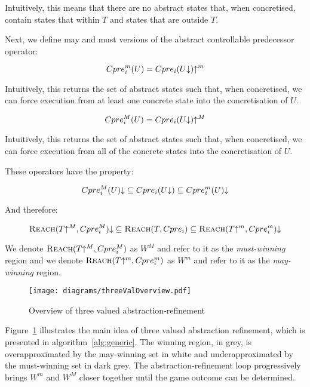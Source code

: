 Intuitively, this means that there are no abstract states that, when concretised, contain states that within $T$ and states that are outside $T$.

Next, we define may and must versions of the abstract controllable predecessor operator:

\begin{equation}
    Cpre_i^m(U) = Cpre_i(U\mathord{\downarrow})\mathord{\uparrow^m}
    \label{eqn:def_cpre_m}
\end{equation}

Intuitively, this returns the set of abstract states such that, when concretised, we can force execution from at least one concrete state into the concretisation of $U$.

\begin{equation}
    Cpre_i^M(U) = Cpre_i(U\mathord{\downarrow})\mathord{\uparrow^M}
    \label{eqn:def_cpre_M}
\end{equation}

Intuitively, this returns the set of abstract states such that, when concretised, we can force execution from all of the concrete states into the concretisation of $U$.

These operators have the property:

\begin{equation}
Cpre_i^M(U)\mathord{\downarrow} \subseteq Cpre_i(U\mathord{\downarrow}) \subseteq Cpre_i^m(U)\mathord{\downarrow}
\end{equation}

And therefore:

\begin{equation}
\textsc{Reach}(T\mathord{\uparrow^M}, Cpre_i^M)\mathord{\downarrow} \subseteq \textsc{Reach}(T, Cpre_i) \subseteq \textsc{Reach}(T\mathord{\uparrow^m}, Cpre_i^m)\mathord{\downarrow}
\end{equation}

We denote $\textsc{Reach}(T\mathord{\uparrow^M}, Cpre_i^M)$ as $W^M$ and refer to it as the \emph{must-winning} region and we denote $\textsc{Reach}(T\mathord{\uparrow^m}, Cpre_i^m)$ as $W^m$ and refer to it as the \emph{may-winning} region.

\begin{figure}[t]
\centering
\texttt{[image: diagrams/threeValOverview.pdf]}
\caption{Overview of three valued abstraction-refinement}
\label{fig:three_val_overview}
\end{figure}

Figure~\ref{fig:three_val_overview} illustrates the main idea of three valued abstraction refinement, which is presented in algorithm~\ref{alg:generic}. The winning region, in grey, is overapproximated by the may-winning set in white and underapproximated by the must-winning set in dark grey. The abstraction-refinement loop progressively brings $W^m$ and $W^M$ closer together until the game outcome can be determined.

